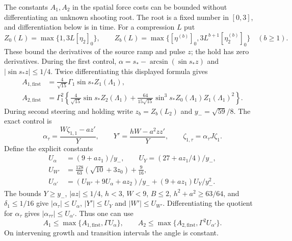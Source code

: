The constants $A_1,A_2$ in the spatial force costs can be bounded
without differentiating an unknown shooting root. The root is a
fixed number in $[0,3]$, and differentiation below is in time.
For a compression $L$ put
\[
 Z_0(L)=\max\{1,3L[\eta_2]_0\},\qquad
 Z_b(L)=\max\{[\eta^{(b)}]_0,
                         3L^{b+1}[\eta_2^{(b)}]_0\}\quad(b\geq1).
\]
These bound the derivatives of the source ramp and pulse $z$;
the hold has zero derivatives. During the first control,
$\alpha=s_*-\arcsin(\sin s_*z)$ and $|\sin s_*z|\leq1/4$.
Twice differentiating this displayed formula gives
\begin{align*}
 A_{1,\mathrm{first}}&=\frac4{\sqrt{15}}\Gamma_1\sin s_*Z_1(\Lambda_1),\\
 A_{2,\mathrm{first}}&=\Gamma_1^2\left\{
   \frac4{\sqrt{15}}\sin s_*Z_2(\Lambda_1)
  +\frac{64}{15\sqrt{15}}\sin^3s_*Z_0(\Lambda_1)Z_1(\Lambda_1)^2
                                                    \right\}.
\end{align*}
During second steering and holding write $z_b=Z_b(L_2)$ and
$y_-=\sqrt{59}/8$. The exact control is
\[
 \alpha_\tau=\frac{W\zeta_{1,1}-az'}Y,
 \qquad Y'=\frac{hW-a^2zz'}Y,
 \qquad\zeta_{1,\tau}=\alpha_\tau J\zeta_1.
\]
Define the explicit constants
\begin{align*}
 U_\alpha&=(9+az_1)/y_-,\qquad
 U_Y=(27+az_1/4)/y_-,\\
 U_{W'}&=\frac{128}{63}(\sqrt{10}+3z_0)+\frac9{16},\\
 U_{\alpha'}&=(U_{W'}+9U_\alpha+az_2)/y_-
                                      +(9+az_1)U_Y/y_-^2.
\end{align*}
The bounds $Y\geq y_-$, $|az|\leq1/4$, $h<3$, $W<9$,
$B\leq2$, $h^2+a^2\geq63/64$, and $\delta_1\leq1/16$
give $|\alpha_\tau|\leq U_\alpha$, $|Y'|\leq U_Y$ and
$|W'|\leq U_{W'}$. Differentiating the quotient for
$\alpha_\tau$ gives $|\alpha_{\tau\tau}|\leq U_{\alpha'}$.
Thus one can use
\[
 A_1\leq\max\{A_{1,\mathrm{first}},\Gamma U_\alpha\},
 \qquad A_2\leq\max\{A_{2,\mathrm{first}},\Gamma^2U_{\alpha'}\}.
\]
On intervening growth and transition intervals the angle is constant.

